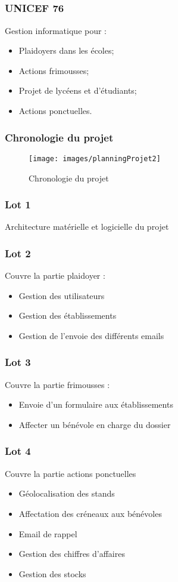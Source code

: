 \speaker{\Mathieu}
\subsection{} %



\begin{frame}
\frametitle{UNICEF 76}
Gestion informatique pour :
	\begin{itemize}
		\item Plaidoyers dans les \'ecoles;
		\item Actions frimousses;
		\item Projet de lycéens et d'étudiants;
		\item Actions ponctuelles.
	\end{itemize}
\end{frame}




\begin{frame}
	\frametitle{Chronologie du projet}
	\begin{figure}
		\begin{landscape}
		\texttt{[image: images/planningProjet2]}
		\end{landscape}
        \caption{Chronologie du projet}
	\end{figure} 
\end{frame}




\begin{frame}
	\frametitle{Lot 1}
	Architecture matérielle et logicielle du projet
\end{frame}


\speaker{\Michel}
\begin{frame}
	\frametitle{Lot 2}
	Couvre la partie plaidoyer :
	\begin{itemize}
		\item Gestion des utilisateurs
		\item Gestion des établissements
		\item Gestion de l'envoie des différents emails
	\end{itemize}
\end{frame}

\begin{frame}
	\frametitle{Lot 3}
	Couvre la partie frimousses :
	\begin{itemize}
		\item Envoie d'un formulaire aux établissements
		\item Affecter un bénévole en charge du dossier
	\end{itemize}
\end{frame}


\begin{frame}
	\frametitle{Lot 4}
	Couvre la partie actions ponctuelles
	\begin{itemize}
		\item Géolocalisation des stands
		\item Affectation des créneaux aux bénévoles
		\item Email de rappel
		\item Gestion des chiffres d'affaires
		\item Gestion des stocks
	\end{itemize}
\end{frame}